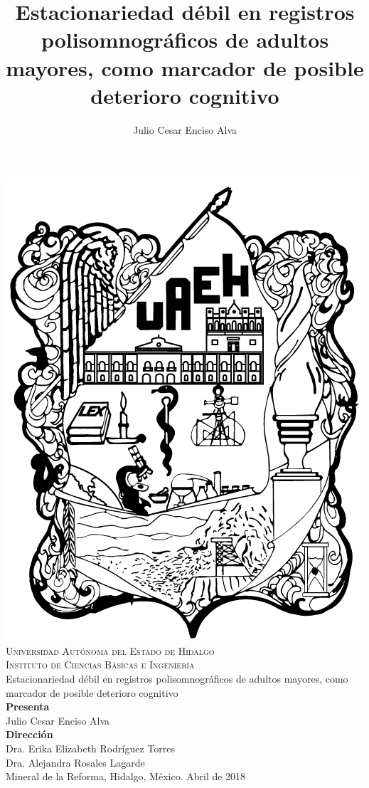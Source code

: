 \documentclass[12pt,letterpaper]{book}
\begin{document}
\setcounter{page}{0}
\thispagestyle{empty}

\title{Estacionariedad débil en registros polisomnográficos de adultos mayores,
como marcador de posible deterioro cognitivo}
\author{Julio Cesar Enciso Alva}

\begin{center}
    \includegraphics[width=0.2\linewidth]{./img_oficiales/logo_uaeh.png}\\
    
    {\large 
        \textsc{
            Universidad Autónoma del Estado de Hidalgo\\
            Instituto de Ciencias Básicas e Ingeniería\\
        }
    }
\vspace*{2.5em}
    {\huge
        Estacionariedad débil en registros polisomnográficos de adultos mayores,
        como marcador de posible deterioro cognitivo\\
    }
\vspace*{2.5em}
    {\large
        \textbf{Presenta}\\
    }
\vspace*{.25em}
    {\Large
        Julio Cesar Enciso Alva\\
    }
\vspace*{3em}
    {\large
        \textbf{Dirección}\\
    }
\vspace*{.25em}
    {\Large
        Dra. Erika Elizabeth Rodríguez Torres\\
        Dra. Alejandra Rosales Lagarde\\
    }
\vspace*{3em}
    {\large
        Mineral de la Reforma, Hidalgo, México. Abril de 2018
    }
\end{center}

\newpage

\end{document}
